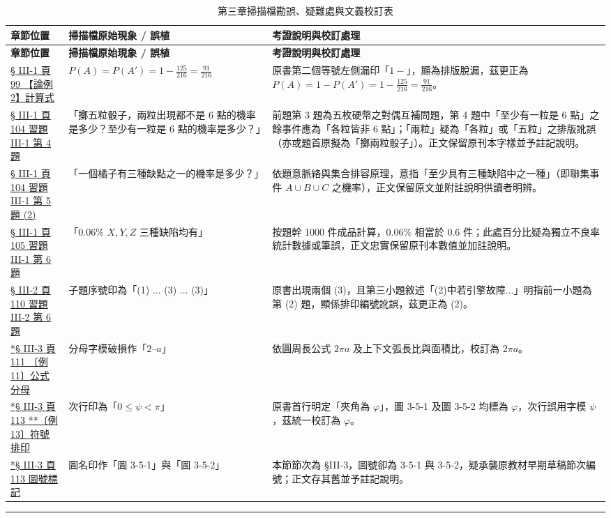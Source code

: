 \documentclass[a4paper,12pt,twoside]{article}
\begin{document}
\small
\renewcommand{\arraystretch}{1.35}
\begin{xltabular}{\textwidth}{|p{3.2cm}|p{3.8cm}|X|}
\caption{第三章掃描檔勘誤、疑難處與文義校訂表}\label{tab:errata_b5_ch3} \\
\hline
\textbf{章節位置} & \textbf{掃描檔原始現象 / 誤植} & \textbf{考證說明與校訂處理} \\ \hline
\endfirsthead
\hline
\textbf{章節位置} & \textbf{掃描檔原始現象 / 誤植} & \textbf{考證說明與校訂處理} \\ \hline
\endhead
\hline
\endfoot

\hyperref[note:b5-ch3-p99-pa]{§ III-1 頁 99 【論例 2】計算式} & 
$P(A) = P(A') = 1 - \frac{125}{216} = \frac{91}{216}$ & 
原書第二個等號左側漏印「$1-$」，顯為排版脫漏，茲更正為 $P(A) = 1 - P(A') = 1 - \frac{125}{216} = \frac{91}{216}$。 \\ \hline

\hyperref[note:b5-ch3-p104-q4]{§ III-1 頁 104 習題 III-1 第 4 題} & 
「擲五粒骰子，兩粒出現都不是 6 點的機率是多少？至少有一粒是 6 點的機率是多少？」 & 
前題第 3 題為五枚硬幣之對偶互補問題，第 4 題中「至少有一粒是 6 點」之餘事件應為「各粒皆非 6 點」；「兩粒」疑為「各粒」或「五粒」之排版訛誤（亦或題首原擬為「擲兩粒骰子」）。正文保留原刊本字樣並予註記說明。 \\ \hline

\hyperref[note:b5-ch3-p104-q5]{§ III-1 頁 104 習題 III-1 第 5 題 (2)} & 
「一個橘子有三種缺點之一的機率是多少？」 & 
依題意脈絡與集合排容原理，意指「至少具有三種缺陷中之一種」（即聯集事件 $A \cup B \cup C$ 之機率），正文保留原文並附註說明供讀者明辨。 \\ \hline

\hyperref[note:b5-ch3-p105-q6]{§ III-1 頁 105 習題 III-1 第 6 題} & 
「0.06\% $X, Y, Z$ 三種缺陷均有」 & 
按題幹 1000 件成品計算，0.06\% 相當於 0.6 件；此處百分比疑為獨立不良率統計數據或筆誤，正文忠實保留原刊本數值並加註說明。 \\ \hline

\hyperref[note:b5-ch3-p110-q6-subnum]{§ III-2 頁 110 習題 III-2 第 6 題} & 
子題序號印為「(1) ... (3) ... (3)」 & 
原書出現兩個 (3)，且第三小題敘述「(2)中若引擎故障...」明指前一小題為第 (2) 題，顯係排印編號訛誤，茲更正為 (2)。 \\ \hline

\hyperref[note:b5-ch3-p111-2pia]{*§ III-3 頁 111 〔例 11〕公式分母} & 
分母字模破損作「$2\text{--}a$」 & 
依圓周長公式 $2\pi a$ 及上下文弧長比與面積比，校訂為 $2\pi a$。 \\ \hline

\hyperref[note:b5-ch3-p113-phi]{*§ III-3 頁 113 **〔例 13〕符號排印} & 
次行印為「$0 \le \psi < \pi$」 & 
原書首行明定「夾角為 $\varphi$」，圖 3-5-1 及圖 3-5-2 均標為 $\varphi$，次行誤用字模 $\psi$，茲統一校訂為 $\varphi$。 \\ \hline

\hyperref[note:b5-ch3-p113-fig-num]{*§ III-3 頁 113 圖號標記} & 
圖名印作「圖 3-5-1」與「圖 3-5-2」 & 
本節節次為 §III-3，圖號卻為 3-5-1 與 3-5-2，疑承襲原教材早期草稿節次編號；正文存其舊並予註記說明。 \\ \hline

\end{xltabular}

\vspace{1em}
\hrule
\vspace{1em}

\tableofcontents
\newpage


\end{document}
